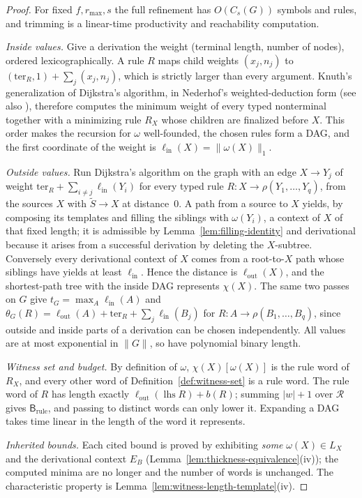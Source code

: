 \begin{proof}
For fixed $f,r_{\max},s$ the full refinement has $O(C_s(G))$ symbols and rules,
and trimming is a linear-time productivity and reachability computation.

\emph{Inside values.}  Give a derivation the weight (terminal length, number of
nodes), ordered lexicographically.  A rule $R$ maps child weights $(x_j,n_j)$ to
$(\mathrm{ter}_R,1)+\sum_j(x_j,n_j)$, which is strictly larger than every argument.  Knuth's
generalization of Dijkstra's algorithm, in Nederhof's weighted-deduction form
\cite{Nederhof2003} (see also \cite{RamalingamReps1996}), therefore computes the
minimum weight of every typed nonterminal together with a minimizing rule $R_X$
whose children are finalized before $X$.  This order makes the recursion for
$\omega$ well-founded, the chosen rules form a DAG, and the first coordinate of
the weight is $\ell_{\mathrm{in}}(X)=\|\omega(X)\|_1$.

\emph{Outside values.}  Run Dijkstra's algorithm on the graph with an edge
$X\to Y_j$ of weight $\mathrm{ter}_R+\sum_{i\ne j}\ell_{\mathrm{in}}(Y_i)$ for every typed rule
$R:X\to\rho(Y_1,\ldots,Y_q)$, from the sources $X$ with $\widetilde S\to X$ at
distance~$0$.  A path from a source to $X$ yields, by composing its templates and
filling the siblings with $\omega(Y_i)$, a context of $X$ of that fixed length; it is
admissible by Lemma~\ref{lem:filling-identity} and derivational because it arises
from a successful derivation by deleting the $X$-subtree.  Conversely every
derivational context of $X$ comes from a root-to-$X$ path whose siblings have
yields at least $\ell_{\mathrm{in}}$.  Hence the distance is $\ell_{\mathrm{out}}(X)$,
and the shortest-path tree with the inside DAG represents $\chi(X)$.  The same two
passes on $G$ give $t_G=\max_A\ell_{\mathrm{in}}(A)$ and
$\theta_G(R)=\ell_{\mathrm{out}}(A)+\mathrm{ter}_R+\sum_j\ell_{\mathrm{in}}(B_j)$ for
$R:A\to\rho(B_1,\ldots,B_q)$, since outside and inside parts of a derivation can be
chosen independently.  All values are at most exponential in $\|G\|$, so have
polynomial binary length.

\emph{Witness set and budget.}  By definition of $\omega$, $\chi(X)[\omega(X)]$ is the
rule word of $R_X$, and every other word of Definition~\ref{def:witness-set} is a
rule word.  The rule word of $R$ has length exactly
$\ell_{\mathrm{out}}(\operatorname{lhs}R)+b(R)$; summing $|w|+1$ over $\mathcal R$
gives $\mathsf B_{\mathrm{rule}}$, and passing to distinct words can only lower it.
Expanding a DAG takes time linear in the length of the word it represents.

\emph{Inherited bounds.}  Each cited bound is proved by exhibiting \emph{some}
$\omega(X)\in L_X$ and the derivational context $E_B$
(Lemma~\ref{lem:thickness-equivalence}(iv)); the computed minima are no longer and
the number of words is unchanged.  The characteristic property is
Lemma~\ref{lem:witness-length-template}(iv).
\end{proof}

